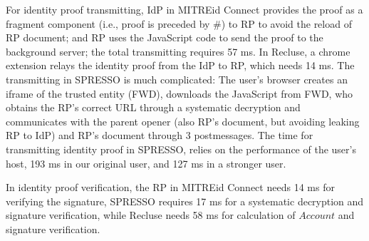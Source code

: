 For identity proof transmitting, IdP in  MITREid Connect provides the proof as a fragment component (i.e., proof is preceded by \#) to RP to avoid the reload of RP document; and RP uses the JavaScript code to send the proof to the background server; the total transmitting requires 57 ms. In Recluse, a chrome extension relays the identity proof from the IdP to RP, which needs 14 ms. The transmitting in SPRESSO is much complicated: The user's browser creates an iframe of the trusted entity (FWD), downloads the JavaScript from FWD, who obtains the RP's correct URL through a systematic decryption and communicates with the parent opener (also RP's document, but avoiding leaking RP to IdP) and RP's document through 3 postmessages. The time for transmitting identity proof in SPRESSO, relies on the performance of the user's host, 193 ms in our original user, and 127 ms in a stronger user.

In identity proof verification, the RP in MITREid Connect needs 14 ms for verifying the signature, SPRESSO requires 17 ms for a systematic decryption and signature verification, while Recluse needs 58 ms for calculation of $Account$ and signature verification.

